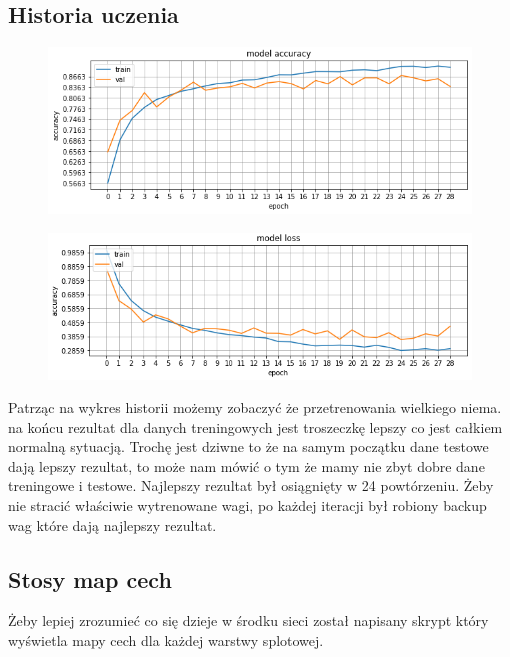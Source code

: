 \documentclass{article}
\begin{document}
\subsection{Historia uczenia}
\begin{figure}[H]
	\centering
	\includegraphics[width=1\textwidth,keepaspectratio=true]{accuracy}
	\caption{}
	\label{accuracy}
\end{figure}

\begin{figure}[H]
	\centering
	\includegraphics[width=1\textwidth,keepaspectratio=true]{loss}
	\caption{}
	\label{loss}
\end{figure}

Patrząc na wykres historii możemy zobaczyć że przetrenowania wielkiego niema. na końcu rezultat dla danych treningowych jest troszeczkę lepszy co jest całkiem normalną sytuacją. Trochę jest dziwne to że na samym początku dane testowe dają lepszy rezultat, to może nam mówić o tym że mamy nie zbyt dobre dane treningowe i testowe. Najlepszy rezultat był osiągnięty w 24 powtórzeniu. Żeby nie stracić właściwie wytrenowane wagi, po każdej iteracji był robiony backup wag które dają najlepszy rezultat. 
\subsection{Stosy map cech}

Żeby lepiej zrozumieć co się dzieje w środku sieci został napisany skrypt który wyświetla mapy cech dla każdej warstwy splotowej.
\end{document}
